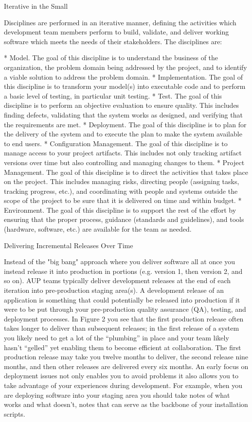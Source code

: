 \documentclass[spanish]{article}
\begin{document}
 
Iterative in the Small

Disciplines are performed in an iterative manner, defining the activities which development team members perform to build, validate, and deliver working software which meets the needs of their stakeholders. The disciplines are:

    * Model.  The goal of this discipline is to understand the business of the organization, the problem domain being addressed by the project, and to identify a viable solution to address the problem domain.
    * Implementation.  The goal of this discipline is to transform your model(s) into executable code and to perform a basic level of testing, in particular unit testing.
    * Test.  The goal of this discipline is to perform an objective evaluation to ensure quality. This includes finding defects, validating that the system works as designed, and verifying that the requirements are met.
    * Deployment.  The goal of this discipline is to plan for the delivery of the system and to execute the plan to make the system available to end users.
    * Configuration Management.  The goal of this discipline is to manage access to your project artifacts. This includes not only tracking artifact versions over time but also controlling and managing changes to them.
    * Project Management.  The goal of this discipline is to direct the activities that takes place on the project. This includes managing risks, directing people (assigning tasks, tracking progress, etc.), and coordinating with people and systems outside the scope of the project to be sure that it is delivered on time and within budget.
    * Environment. The goal of this discipline is to support the rest of the effort by ensuring that the proper process, guidance (standards and guidelines), and tools (hardware, software, etc.) are available for the team as needed.

 
Delivering Incremental Releases Over Time

Instead of the "big bang" approach where you deliver software all at once you instead release it into production in portions (e.g. version 1, then version 2, and so on).  AUP teams typically deliver development releases at the end of each iteration into pre-production staging area(s).  A development release of an application is something that could potentially be released into production if it were to be put through your pre-production quality assurance (QA), testing, and deployment processes.  In Figure 2 you see that the first production release often takes longer to deliver than subsequent releases; in the first release of a system you likely need to get a lot of the “plumbing” in place and your team likely hasn’t “gelled” yet enabling them to become efficient at collaboration.  The first production release may take you twelve months to deliver, the second release nine months, and then other releases are delivered every six months.  An early focus on deployment issues not only enables you to avoid problems it also allows you to take advantage of your experiences during development.  For example, when you are deploying software into your staging area you should take notes of what works and what doesn’t, notes that can serve as the backbone of your installation scripts.
\end{document}
